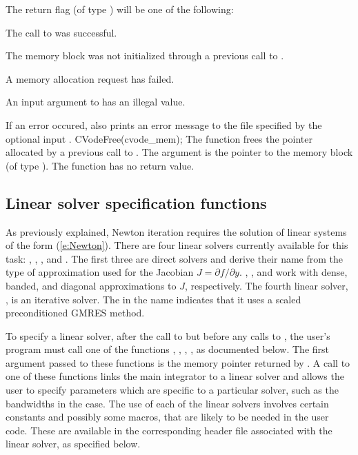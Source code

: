 {
  The return flag  (of type ) will be one of the following:
  \begin{args}
  \item[\Id{SUCCESS}]
    The call to  was successful.
  \item[\Id{CVM\_NO\_MEM}] 
    The {\cvode} memory block was not initialized through a previous call to .
  \item[\Id{CVM\_MEM\_FAIL}] 
    A memory allocation request has failed.
  \item[\Id{CVM\_ILL\_INPUT}] 
    An input argument to  has an illegal value.
  \end{args}
}
{
  If an error occured,  also prints an error message to the
  file specified by the optional input .
}
{
  CVodeFree(cvode\_mem);
}
{
  The function  frees the pointer allocated by
  a previous call to .
}
{
  The argument is the pointer to the {\cvode} memory block (of type ).
}
{
  The function  has no return value.
}
{}
\subsection{Linear solver specification functions}\label{sss:lin_solv_init}

As previously explained, Newton iteration requires the solution of
linear systems of the form (\ref{e:Newton}).  There are four {\cvode} linear
solvers currently available for this task: {\cvdense}, {\cvband}, {\cvdiag},
and {\cvspgmr}.  The first three are direct solvers and derive their name
from the type of approximation used for the Jacobian 
$J = \partial{f}/\partial{y}$.  {\cvdense}, {\cvband}, and {\cvdiag} work with
dense, banded, and diagonal approximations to $J$, respectively.  The
fourth {\cvode} linear solver, {\cvspgmr}, is an iterative solver.  The {\spgmr}
in the name indicates that it uses a scaled preconditioned
GMRES method.

To specify a {\cvode} linear solver, after the call to 
but before any calls to , the user's program must call one
of the functions , , , ,
as documented below. The first argument passed to these functions is the {\cvode}
memory pointer returned by .  A call to one of these
functions links the main {\cvode} integrator to a linear solver and
allows the user to specify parameters which are specific to a
particular solver, such as the bandwidths in the {\cvband} case.
The use of each of the linear solvers involves certain constants and possibly 
some macros, that are likely to be needed in the user code.  These are
available in the corresponding header file associated with the linear
solver, as specified below.

